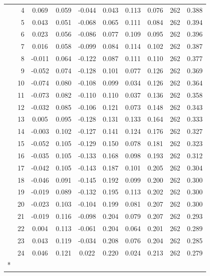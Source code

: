 \begin{longtable}[t]{lrcccccccc}
 & 4 & 0.069 & 0.059 & -0.044 & 0.043 & 0.113 & 0.076 & 262 & 0.388\\
 & 5 & 0.043 & 0.051 & -0.068 & 0.065 & 0.111 & 0.084 & 262 & 0.394\\
 & 6 & 0.023 & 0.056 & -0.086 & 0.077 & 0.109 & 0.095 & 262 & 0.396\\
 & 7 & 0.016 & 0.058 & -0.099 & 0.084 & 0.114 & 0.102 & 262 & 0.387\\
 & 8 & -0.011 & 0.064 & -0.122 & 0.087 & 0.111 & 0.110 & 262 & 0.377\\
 & 9 & -0.052 & 0.074 & -0.128 & 0.101 & 0.077 & 0.126 & 262 & 0.369\\
 & 10 & -0.074 & 0.080 & -0.108 & 0.099 & 0.034 & 0.126 & 262 & 0.364\\
 & 11 & -0.073 & 0.082 & -0.110 & 0.110 & 0.037 & 0.136 & 262 & 0.358\\
 & 12 & -0.032 & 0.085 & -0.106 & 0.121 & 0.073 & 0.148 & 262 & 0.343\\
 & 13 & 0.005 & 0.095 & -0.128 & 0.131 & 0.133 & 0.164 & 262 & 0.333\\
 & 14 & -0.003 & 0.102 & -0.127 & 0.141 & 0.124 & 0.176 & 262 & 0.327\\
 & 15 & -0.052 & 0.105 & -0.129 & 0.150 & 0.078 & 0.181 & 262 & 0.323\\
 & 16 & -0.035 & 0.105 & -0.133 & 0.168 & 0.098 & 0.193 & 262 & 0.312\\
 & 17 & -0.042 & 0.105 & -0.143 & 0.187 & 0.101 & 0.205 & 262 & 0.304\\
 & 18 & -0.046 & 0.091 & -0.145 & 0.192 & 0.099 & 0.200 & 262 & 0.300\\
 & 19 & -0.019 & 0.089 & -0.132 & 0.195 & 0.113 & 0.202 & 262 & 0.300\\
 & 20 & -0.023 & 0.103 & -0.104 & 0.199 & 0.081 & 0.207 & 262 & 0.300\\
 & 21 & -0.019 & 0.116 & -0.098 & 0.204 & 0.079 & 0.207 & 262 & 0.293\\
 & 22 & 0.004 & 0.113 & -0.061 & 0.204 & 0.064 & 0.201 & 262 & 0.289\\
 & 23 & 0.043 & 0.119 & -0.034 & 0.208 & 0.076 & 0.204 & 262 & 0.285\\
 & 24 & 0.046 & 0.121 & 0.022 & 0.220 & 0.024 & 0.213 & 262 & 0.279\\*
\end{longtable}
\endgroup{}
